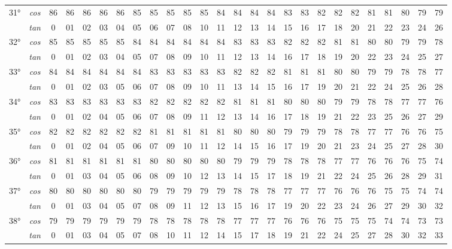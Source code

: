 \begin{tiny}
\begin{longtable}{c c |c |c |c |c |c |c |c |c |c |c |c |c |c |c |c |c |c |c |c |c |c |c |c |c}
		\multirow{2}{*}{31°}&\textit{cos}& 86& 86& 86& 86& 86& 85& 85& 85& 85& 85& 84& 84& 84& 84& 83& 83& 82& 82& 82& 81& 81& 80& 79& 79\\* \space&\textit{tan} & 0 & 01 & 02 & 03 & 04 & 05 & 06 & 07 & 08& 10& 11& 12& 13& 14& 15& 16& 17& 18& 20& 21& 22& 23& 24& 26\\\hline
		\multirow{2}{*}{32°}&\textit{cos}& 85& 85& 85& 85& 85& 84& 84& 84& 84& 84& 84& 83& 83& 83& 82& 82& 82& 81& 81& 80& 80& 79& 79& 78\\* \space&\textit{tan} & 0 & 01 & 02 & 03 & 04 & 05 & 07 & 08 & 09& 10& 11& 12& 13& 14& 16& 17& 18& 19& 20& 22& 23& 24& 25& 27\\\hline
		\multirow{2}{*}{33°}&\textit{cos}& 84& 84& 84& 84& 84& 84& 83& 83& 83& 83& 83& 82& 82& 82& 81& 81& 81& 80& 80& 79& 79& 78& 78& 77\\* \space&\textit{tan} & 0 & 01 & 02 & 03 & 05 & 06 & 07 & 08 & 09& 10& 11& 13& 14& 15& 16& 17& 19& 20& 21& 22& 24& 25& 26& 28\\\hline
		\multirow{2}{*}{34°}&\textit{cos}& 83& 83& 83& 83& 83& 83& 82& 82& 82& 82& 82& 81& 81& 81& 80& 80& 80& 79& 79& 78& 78& 77& 77& 76\\* \space&\textit{tan} & 0 & 01 & 02 & 04 & 05 & 06 & 07 & 08 & 09& 11& 12& 13& 14& 16& 17& 18& 19& 21& 22& 23& 25& 26& 27& 29\\\hline
		\multirow{2}{*}{35°}&\textit{cos}& 82& 82& 82& 82& 82& 82& 81& 81& 81& 81& 81& 80& 80& 80& 79& 79& 79& 78& 78& 77& 77& 76& 76& 75\\* \space&\textit{tan} & 0 & 01 & 02 & 04 & 05 & 06 & 07 & 09& 10& 11& 12& 14& 15& 16& 17& 19& 20& 21& 23& 24& 25& 27& 28& 30\\\hline
		\multirow{2}{*}{36°}&\textit{cos}& 81& 81& 81& 81& 81& 81& 80& 80& 80& 80& 80& 79& 79& 79& 78& 78& 78& 77& 77& 76& 76& 76& 75& 74\\* \space&\textit{tan} & 0 & 01 & 03 & 04 & 05 & 06 & 08 & 09& 10& 12& 13& 14& 15& 17& 18& 19& 21& 22& 24& 25& 26& 28& 29& 31\\\hline
		\multirow{2}{*}{37°}&\textit{cos}& 80& 80& 80& 80& 80& 80& 79& 79& 79& 79& 79& 78& 78& 78& 77& 77& 77& 76& 76& 76& 75& 75& 74& 74\\* \space&\textit{tan} & 0 & 01 & 03 & 04 & 05 & 07 & 08 & 09& 11& 12& 13& 15& 16& 17& 19& 20& 22& 23& 24& 26& 27& 29& 30& 32\\\hline
		\multirow{2}{*}{38°}&\textit{cos}& 79& 79& 79& 79& 79& 79& 78& 78& 78& 78& 78& 77& 77& 77& 76& 76& 76& 75& 75& 75& 74& 74& 73& 73\\* \space&\textit{tan} & 0 & 01 & 03 & 04 & 05 & 07 & 08& 10& 11& 12& 14& 15& 17& 18& 19& 21& 22& 24& 25& 27& 28& 30& 32& 33\\\hline

\end{longtable}
\end{tiny}
